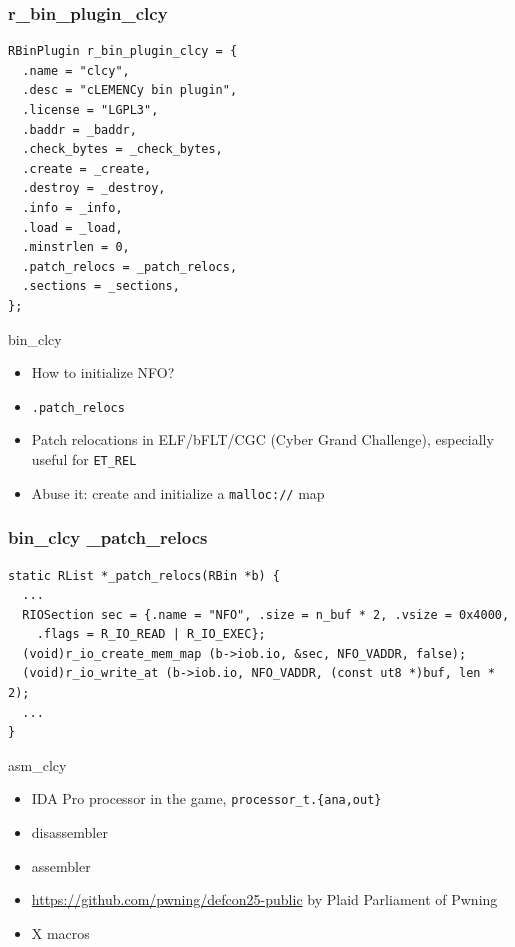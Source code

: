 \documentclass{beamer}
\begin{document}
\begin{frame}[fragile]
  \frametitle{r\_bin\_plugin\_clcy}
  \scriptsize
  \begin{verbatim}
RBinPlugin r_bin_plugin_clcy = {
  .name = "clcy",
  .desc = "cLEMENCy bin plugin",
  .license = "LGPL3",
  .baddr = _baddr,
  .check_bytes = _check_bytes,
  .create = _create,
  .destroy = _destroy,
  .info = _info,
  .load = _load,
  .minstrlen = 0,
  .patch_relocs = _patch_relocs,
  .sections = _sections,
};
  \end{verbatim}
\end{frame}

\begin{frame}{bin\_clcy}
  \begin{itemize}[<+->]
  \item How to initialize NFO?
  \item \texttt{.patch\_relocs}
  \item Patch relocations in ELF/bFLT/CGC (Cyber Grand Challenge), especially
    useful for \texttt{ET\_REL}
  \item Abuse it: create and initialize a \texttt{malloc://} map
  \end{itemize}
\end{frame}

\begin{frame}[fragile]
  \frametitle{bin\_clcy \_patch\_relocs}
  \scriptsize
  \begin{verbatim}
static RList *_patch_relocs(RBin *b) {
  ...
  RIOSection sec = {.name = "NFO", .size = n_buf * 2, .vsize = 0x4000,
    .flags = R_IO_READ | R_IO_EXEC};
  (void)r_io_create_mem_map (b->iob.io, &sec, NFO_VADDR, false);
  (void)r_io_write_at (b->iob.io, NFO_VADDR, (const ut8 *)buf, len * 2);
  ...
}
  \end{verbatim}
\end{frame}

\begin{frame}{asm\_clcy}
  \begin{itemize}
    \item IDA Pro processor in the game, \texttt{processor\_t.\{ana,out\}}
    \item disassembler
    \item assembler
    \item \url{https://github.com/pwning/defcon25-public} by Plaid Parliament of Pwning
    \item X macros
  \end{itemize}
\end{frame}
\end{document}

